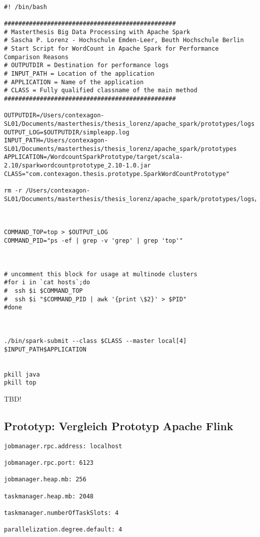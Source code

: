 \begin{lstlisting}[label=sparkshell,caption=ShellScript zum Start des Spark-WordCount-Prototyp]

#! /bin/bash

################################################
# Masterthesis Big Data Processing with Apache Spark
# Sascha P. Lorenz - Hochschule Emden-Leer, Beuth Hochschule Berlin
# Start Script for WordCount in Apache Spark for Performance Comparison Reasons	
# OUTPUTDIR = Destination for performance logs
# INPUT_PATH = Location of the application 
# APPLICATION = Name of the application
# CLASS = Fully qualified classname of the main method
################################################

OUTPUTDIR=/Users/contexagon-SL01/Documents/masterthesis/thesis_lorenz/apache_spark/prototypes/logs
OUTPUT_LOG=$OUTPUTDIR/simpleapp.log
INPUT_PATH=/Users/contexagon-SL01/Documents/masterthesis/thesis_lorenz/apache_spark/prototypes
APPLICATION=/WordcountSparkPrototype/target/scala-2.10/sparkwordcountprototype_2.10-1.0.jar
CLASS="com.contexagon.thesis.prototype.SparkWordCountPrototype"

rm -r /Users/contexagon-SL01/Documents/masterthesis/thesis_lorenz/apache_spark/prototypes/logs/sparkOutput.out



COMMAND_TOP=top > $OUTPUT_LOG
COMMAND_PID="ps -ef | grep -v 'grep' | grep 'top'"



# uncomment this block for usage at multinode clusters
#for i in `cat hosts`;do
#  ssh $i $COMMAND_TOP
#  ssh $i "$COMMAND_PID | awk '{print \$2}' > $PID"
#done



./bin/spark-submit --class $CLASS --master local[4] $INPUT_PATH$APPLICATION


pkill java
pkill top

\end{lstlisting}

TBD!

\subsection{Prototyp: Vergleich Prototyp Apache Flink }
\label{section:vergleich apache flink}


\begin{lstlisting}[label=flink config,caption=Konfigurationseinstellungen der lokalen Flink-Installation]
jobmanager.rpc.address: localhost

jobmanager.rpc.port: 6123

jobmanager.heap.mb: 256

taskmanager.heap.mb: 2048

taskmanager.numberOfTaskSlots: 4

parallelization.degree.default: 4
\end{lstlisting}




